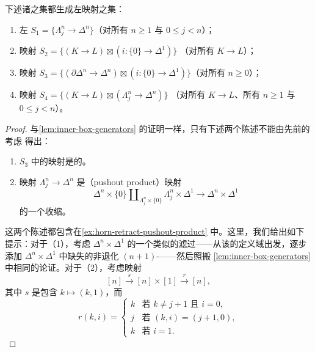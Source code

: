 \begin{lemma}\label{lem:left-box-generators}
下述诸\trMorphism{}之集都生成左\trAnodyne{}映射之集：
\begin{enumerate}[label=(\arabic*)]
  \item 左\trHornInclusion{} $S_1 = \{\Lambda^n_j \to \Delta^n\}$（对所有
  $n \ge 1$ 与 $0 \le j < n$）；
  \item 映射 $S_2 = \{(K \to L) \boxtimes (i\colon \{0\} \to \Delta^1)\}$
  （对所有\trMonomorphism{} $K \to L$）；
  \item 映射 $S_3 = \{(\partial\Delta^n \to \Delta^n) \boxtimes (i\colon \{0\} \to \Delta^1)\}$（对所有 $n \ge 0$）；
  \item 映射 $S_4 = \{(K \to L) \boxtimes (\Lambda^n_j \to \Delta^n)\}$
  （对所有\trMonomorphism{} $K \to L$、所有 $n \ge 1$ 与 $0 \le j < n$）。
\end{enumerate}
\end{lemma}

\begin{proof}
与\cref{lem:inner-box-generators} 的证明一样，只有下述两个陈述不能由先前的考虑
得出：
\begin{enumerate}[label=(\arabic*)]
  \item $S_3$ 中的映射是\trLeftAnodyne{}的。
  \item 映射 $\Lambda^n_j \to \Delta^n$ 是\trPushoutProduct{}（pushout product）映射
  \[
  \Delta^n \times \{0\} \amalg_{\Lambda^n_j \times \{0\}}
  \Lambda^n_j \times \Delta^1 \to \Delta^n \times \Delta^1
  \]
  的一个收缩。
\end{enumerate}
这两个陈述都包含在\cref{ex:horn-retract-pushout-product} 中。这里，我们给出如下提示：对于（1），考虑
$\Delta^n \times \Delta^1$ 的一个类似的滤过——从该\trPushoutProduct{}的定义域出发，逐步
添加 $\Delta^n \times \Delta^1$ 中缺失的非退化 $(n + 1)$-\trSimplex{}——然后照搬
\cref{lem:inner-box-generators} 中相同的论证。对于（2），考虑映射
\[
[n] \xrightarrow{\ s\ } [n] \times [1] \xrightarrow{\ r\ } [n],
\]
其中 $s$ 是包含 $k \mapsto (k, 1)$，而
\[
r(k, i) =
\begin{cases}
k & \text{若 } k \ne j + 1 \text{ 且 } i = 0,\\
j & \text{若 } (k, i) = (j + 1, 0),\\
k & \text{若 } i = 1.
\end{cases}
\]
\end{proof}

